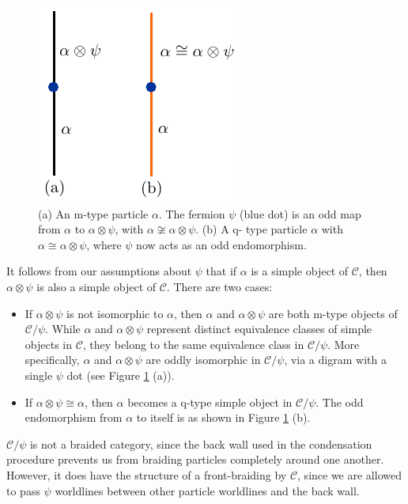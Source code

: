 \documentclass[12pt,a4paper]{article}
\newcommand{\tp}{\otimes}
\newcommand{\mcc}{\mathcal{C}}
\newcommand{\ot}{\otimes}
\begin{document}
\begin{figure}
\begin{center}
\includegraphics{mvsqtype.pdf}
\caption{ \label{mvsqtype} (a) An m-type particle $\alpha$. The fermion $\psi$ (blue dot) is 
an odd map from $\alpha$ to $\alpha\tp \psi$, with $\alpha\not\cong\alpha\tp\psi$. (b) A q-
type particle $\alpha$ with $\alpha\cong\alpha\tp\psi$, where $\psi$ now acts as an odd 
endomorphism.}
\end{center}
\end{figure} 

It follows from our assumptions about $\psi$ that if $\alpha$ is a simple object of $\mcc$, then
$\alpha\ot\psi$ is also a simple object of $\mcc$.
There are two cases:
\begin{itemize}
	\item If $\alpha\ot\psi$ is not isomorphic to $\alpha$, then $\alpha$ and $\alpha\ot\psi$ are both m-type
	objects of $\mcc/\psi$.
	While $\alpha$ and $\alpha\ot\psi$ represent distinct equivalence classes of simple objects in $\mcc$,
	they belong to the same equivalence class in $\mcc/
	\psi$.
	More specifically, $\alpha$ and $\alpha\ot\psi$ are oddly isomorphic in $\mcc/\psi$, 
	via a digram with a single $\psi$ dot (see Figure \ref{mvsqtype} (a)).
	\item If $\alpha\ot\psi \cong \alpha$, then $\alpha$ becomes a q-type simple object in $\mcc/\psi$.
	The odd endomorphism from $\alpha$ to itself is as shown in Figure \ref{mvsqtype} (b).
\end{itemize}

\medskip

$\mcc/\psi$ is not a braided category, since the back wall used in the condensation procedure 
prevents us from braiding particles completely around one another. 
However, it does have the structure of a front-braiding by $\mcc$, since we are allowed to 
pass $\psi$ worldlines between other particle worldlines and the back wall. 
\end{document}
